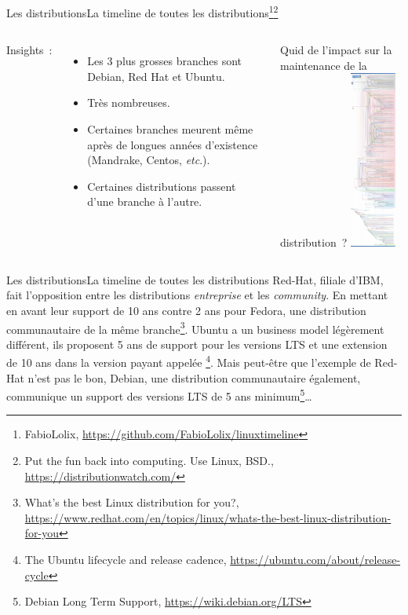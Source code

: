 \documentclass{beamer}
\begin{document}
    \begin{frame}{Les distributions}{La timeline de toutes les distributions\footnote{FabioLolix, \url{https://github.com/FabioLolix/linuxtimeline}}\footnotestep\footnote{Put the fun back into computing. Use Linux, BSD., \url{https://distributionwatch.com/}}}
        \begin{columns}
            Insights~:
            \begin{itemize}
                \item Les 3 plus grosses branches sont Debian, Red Hat et Ubuntu.
                \item Très nombreuses.
                \item Certaines branches meurent même après de longues années d'existence (Mandrake, Centos, \textit{etc}.).
                \item Certaines distributions passent d'une branche à l'autre.
            \end{itemize}
            Quid de l'impact sur la maintenance de la distribution~?
            \centering
            \includegraphics[width=1.5cm]{image/linux-all-distro-timeline}
        \end{columns}
    \end{frame}

    \begin{frame}{Les distributions}{La timeline de toutes les distributions}
        Red-Hat, filiale d'IBM, fait l'opposition entre les distributions \textit{entreprise} et les \textit{community}.
        En mettant en avant leur support de 10 ans contre 2 ans pour Fedora, une distribution communautaire de la même branche\footnote{What's the best Linux distribution for you?, \url{https://www.redhat.com/en/topics/linux/whats-the-best-linux-distribution-for-you}}.
        \bigbreak
        Ubuntu a un business model légèrement différent, ils proposent 5 ans de support pour les versions LTS et une extension de 10 ans dans la version payant appelée \footnote{The Ubuntu lifecycle and release cadence, \url{https://ubuntu.com/about/release-cycle}}.
        \bigbreak
        Mais peut-être que l'exemple de Red-Hat n'est pas le bon, Debian, une distribution communautaire également, communique un support des versions LTS de 5 ans minimum\footnote{Debian Long Term Support, \url{https://wiki.debian.org/LTS}}\ldots
    \end{frame}
\end{document}
